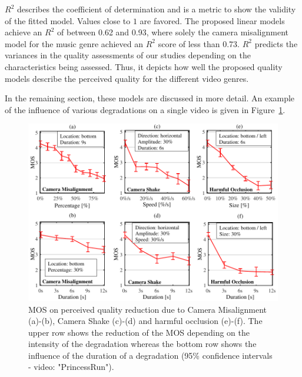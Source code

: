 $R^2$ describes the coefficient of determination and is a metric to show the validity of the fitted model. Values close to $1$ are favored.
The proposed linear models achieve an $R^2$ of between 0.62 and 0.93, where solely the camera misalignment model for the music genre achieved an $R^2$ score of less than 0.73. 
$R^2$ predicts the variances in the quality assessments of our studies depending on the characteristics being assessed.
Thus, it depicts how well the proposed quality models describe the perceived quality for the different video genres. 

In the remaining section, these models are discussed in more detail.
An example of the influence of various degradations on a single video is given in Figure~\ref{fig:430_surface_degradation}.
\begin{figure}[htb]
	
	\centering
	\includegraphics{gfx/400_UGV_Quality/degradationsSingle.pdf}
	\caption[Attributes of the perceived quality models for recording degradations]{MOS on perceived quality reduction due to Camera Misalignment (a)-(b), Camera Shake (c)-(d) and harmful occlusion (e)-(f). The upper row shows the reduction of the MOS depending on the intensity of the degradation whereas the bottom row shows the influence of the duration of a degradation (95\% confidence intervals - video: "PrincessRun").}
	\label{fig:430_surface_degradation}
\end{figure} 
